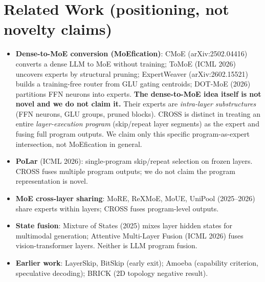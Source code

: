 \documentclass[11pt,a4paper]{article}
\begin{document}
\section{Related Work (positioning, not novelty claims)}
\begin{itemize}[leftmargin=*]
  \item \textbf{Dense-to-MoE conversion (MoEfication)}: CMoE (arXiv:2502.04416)
        converts a dense LLM to MoE without training; ToMoE (ICML 2026) uncovers
        experts by structural pruning; ExpertWeaver (arXiv:2602.15521) builds a
        training-free router from GLU gating centroids; DOT-MoE (2026) partitions
        FFN neurons into experts. \textbf{The dense-to-MoE idea itself is not novel
        and we do not claim it.} Their experts are \emph{intra-layer substructures}
        (FFN neurons, GLU groups, pruned blocks). CROSS is distinct in treating an
        entire \emph{layer-execution program} (skip/repeat layer segments) as the
        expert and fusing full program outputs. We claim only this specific
        program-as-expert intersection, not MoEfication in general.
  \item \textbf{PoLar} (ICML 2026): single-program skip/repeat selection on frozen
        layers. CROSS fuses multiple program outputs; we do not claim the program
        representation is novel.
  \item \textbf{MoE cross-layer sharing}: MoRE, ReXMoE, MoUE, UniPool (2025--2026)
        share experts within layers; CROSS fuses program-level outputs.
  \item \textbf{State fusion}: Mixture of States (2025) mixes layer hidden states
        for multimodal generation; Attentive Multi-Layer Fusion (ICML 2026) fuses
        vision-transformer layers. Neither is LLM program fusion.
  \item \textbf{Earlier work}: LayerSkip, BitSkip (early exit); Amoeba (capability
        criterion, speculative decoding); BRICK (2D topology negative result).
\end{itemize}
\end{document}
